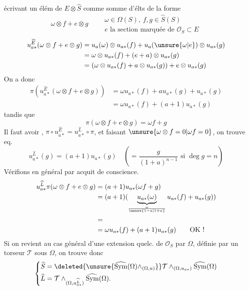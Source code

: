 écrivant un élém de $E\otimes\widehat S$  comme somme d'élts de la forme
\[
\omega\otimes f+e\otimes g\qquad
\begin{gathered}\omega\in\Omega(S),\ f,g\in\widehat S(S)\\e\text{ la section marquée de }\mathcal{O}_S\subset E\end{gathered}
\]
\[
\begin{aligned}
u_{a*}^{\widehat E}(\omega\otimes f+e\otimes g)
&=u_a(\omega)\otimes u_{a*}(f)+u_a(\unsure{\omega|e})\otimes u_{a*}(g)\\
&=\omega\otimes u_{a*}(f)+(e+a)\otimes u_{a*}(g)\\
&=(\omega\otimes u_{a*}(f)+a\otimes u_{a*}(g))+e\otimes u_{a*}(g)
\end{aligned}
\]
On a donc
\[
\begin{aligned}
\pi(u_{a*}^{\widehat E}(\omega\otimes f+e\otimes g))
&=\omega u_{a*}(f)+a u_{a*}(g)+u_{a*}(g)\\
&=\omega u_{a*}(f)+(a+1)u_{a*}(g)
\end{aligned}
\]
tandis que
\[
\pi(\omega\otimes f+e\otimes g)=\omega f+g
\]
Il faut avoir
, $\pi\circ u_{a*}^{\widehat E}=u_{a*}^{\widehat L}\circ\pi$, et faisant $\unsure{\omega\otimes f=0|\omega f=0}$, on trouve eq.
\[
\boxed{u_{a*}^{\widehat L}(g)=(a+1)u_{a*}(g)}
\quad\left(=\frac{g}{(1+a)^{n-1}}\text{ si }\deg g=n\right)
\]
Vérifions  en général par acquit de conscience.
\[
\begin{aligned}
u_{a*}^{\widehat L}\pi(\omega\otimes f+e\otimes g)
&=(a+1)u_{a*}(\omega f+g)\\
&=(a+1)(\underbrace{u_{a*}(\omega)}_{\frac{\omega}{\unsure{1-a|1+a}}}u_{a*}(f)+u_{a*}(g))\\
&=\\
&=\omega u_{a*}(f)+(a+1)u_{a*}(g)\qquad\text{OK !}
\end{aligned}
\]
Si on revient au cas général d'une extension quelc. de $\mathcal{O}_S$ par $\Omega$, définie par un torseur $\mathcal{T}$ sous $\Omega$, on trouve donc
\[
\left\{\begin{aligned}
\widehat S&=\deleted{\unsure{\widehat{\operatorname{Sym}}(\Omega)\wedge_{(\Omega,u)}}}\mathcal{T}\wedge_{(\Omega,u_{a*})}\widehat{\operatorname{Sym}}(\Omega)\\
\widehat L&=\mathcal{T}\wedge_{(\Omega,u_{a*}^{\widehat L})}\widehat{\operatorname{Sym}}(\Omega).
\end{aligned}\right.
\]
